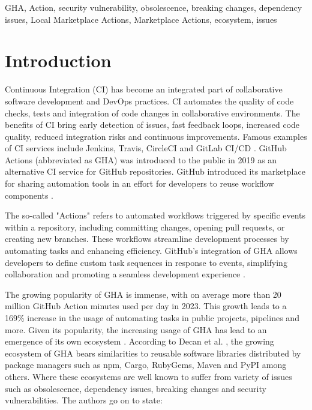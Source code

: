 \documentclass[conference]{IEEEtran}
\begin{document}
\begin{IEEEkeywords}
GHA, Action, security vulnerability, obsolescence, breaking changes, dependency issues, Local Marketplace Actions, Marketplace Actions, ecosystem, issues
\end{IEEEkeywords}

\section{Introduction}
    Continuous Integration (CI) has become an integrated part of collaborative software development and DevOps practices. CI automates the quality of code checks, tests and integration of code changes in collaborative environments. The benefits of CI bring early detection of issues, fast feedback loops, increased code quality, reduced integration risks and continuous improvements. Famous examples of CI services include Jenkins, Travis, CircleCI and GitLab CI/CD \cite{dabbish2012social}. GitHub Actions (abbreviated as GHA) was introduced to the public in 2019 as an alternative CI service for GitHub repositories. GitHub introduced its marketplace for sharing automation tools in an effort for developers to reuse workflow components \cite{saroar2023developers}. 
 
    The so-called "Actions" refers to automated workflows triggered by specific events within a repository, including committing changes, opening pull requests, or creating new branches. These workflows streamline development processes by automating tasks and enhancing efficiency. GitHub's integration of GHA allows developers to define custom task sequences in response to events, simplifying collaboration and promoting a seamless development experience \cite{chandrasekara2021getting}. 

    The growing popularity of GHA is immense, with on average more than 20 million GitHub Action minutes used per day in 2023. This growth leads to a 169\% increase in the usage of automating tasks in public projects,  pipelines and more\cite{github2023octoverse}. Given its popularity,  the increasing usage of GHA has lead to an emergence of its own ecosystem \cite{decan2022use}.  According to Decan et al. \cite{decan2022use}, the growing ecosystem of GHA bears similarities to reusable software libraries distributed by package managers such as npm, Cargo, RubyGems, Maven and PyPI among others. Where these ecosystems are well known to suffer from variety of issues such as obsolescence, dependency issues, breaking changes and security vulnerabilities\cite{decan2022use}. The authors go on to state:\\
\end{document}

